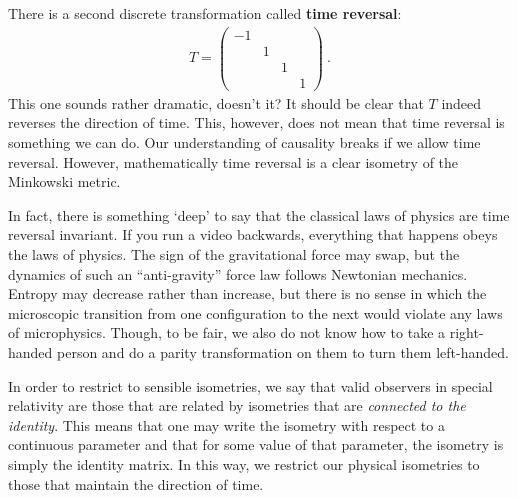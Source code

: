 \documentclass[12pt, oneside]{report}    %
\begin{document}
\begin{subappendices}
There is a second discrete transformation called \textbf{time reversal}:
\begin{align}
    T = 
    \begin{pmatrix}
        -1 & & &\\
        & 1 & &\\
        &  & 1 &\\
        &  & & 1
    \end{pmatrix} \ .
\end{align}
This one sounds rather dramatic, doesn't it? It should be clear that $T$ indeed reverses the direction of time. This, however, does not mean that time reversal is something we can do. Our understanding of causality breaks if we allow time reversal. However, mathematically time reversal is a clear isometry of the Minkowski metric. 

In fact, there is something `deep' to say that the classical laws of physics are time reversal invariant. If you run a video backwards, everything that happens obeys the laws of physics. The sign of the gravitational force may swap, but the dynamics of such an ``anti-gravity'' force law follows Newtonian mechanics. Entropy may decrease rather than increase, but there is no sense in which the microscopic transition from one configuration to the next would violate any laws of microphysics. Though, to be fair, we also do not know how to take a right-handed person and do a parity transformation on them to turn them left-handed. 


In order to restrict to sensible isometries, we say that valid observers in special relativity are those that are related by isometries that are \emph{connected to the identity}. This means that one may write the isometry with respect to a continuous parameter and that for some value of that parameter, the isometry is simply the identity matrix. In this way, we restrict our physical isometries to those that maintain the direction of time. 


\end{subappendices}
\end{document}
